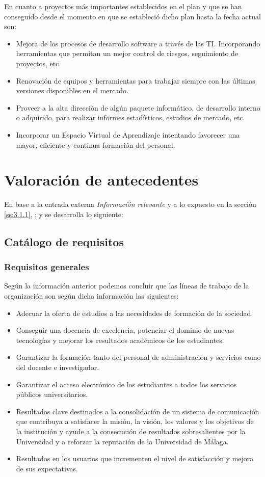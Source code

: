 \documentclass[11pt,a4paper,spanish,twoside]{book}
\begin{document}
En cuanto a proyectos más importantes establecidos en el plan y que se han
conseguido desde el momento en que se estableció dicho plan hasta la fecha
actual son: 
\begin{itemize}
\item Mejora de los procesos de desarrollo software a través de las
  TI. Incorporando herramientas que permitan un mejor control de riesgos,
  seguimiento de proyectos, etc.  

\item Renovación de equipos y herramientas para trabajar siempre con las
  últimas versiones disponibles en el mercado.

\item Proveer a la alta dirección de algún paquete informático, de desarrollo
  interno o adquirido, para realizar informes estadísticos, estudios de
  mercado, etc. 

\item Incorporar un Espacio Virtual de Aprendizaje intentando favorecer
  una mayor, eficiente y continua formación del personal.  
\end{itemize}
        
\section{Valoración de antecedentes} \label{3.2.1}
En base a la entrada externa \emph{Información relevante} y a lo expuesto 
en la sección \vref{ss:3.1.1}, \emph{}; y
se desarrolla lo siguiente:

\subsection{Catálogo de requisitos}
\subsubsection{Requisitos generales}
Según la información anterior podemos concluir que las líneas de trabajo de
la organización son según dicha información las siguientes: 
\begin{itemize}
\item Adecuar la oferta de estudios a las necesidades de formación de la
sociedad.
\item Conseguir una docencia de excelencia, potenciar el dominio de nuevas
tecnologías y mejorar los resultados académicos de los estudiantes.
\item Garantizar la formación tanto del personal de administración y servicios
como del docente e investigador.
\item Garantizar el acceso electrónico de los estudiantes a todos los servicios
públicos universitarios.
\item Resultados clave destinados a la consolidación de un sistema de
comunicación que contribuya a satisfacer la misión, la visión, los valores
y los objetivos de la institución y ayude a la consecución de resultados
sobresalientes por la Universidad y a reforzar la reputación de la
Universidad de Málaga.
\item Resultados en los usuarios que incrementen el nivel de satisfacción y
mejora de sus expectativas.
\end{itemize}
        
\end{document}
